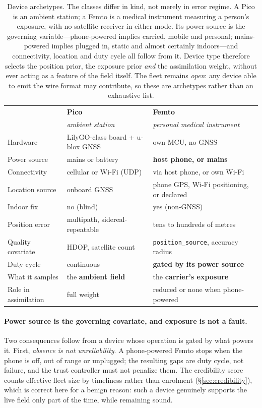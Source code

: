 \documentclass[10pt]{article}
\begin{document}
\begin{table}[t]
\centering
\small
\begin{tabular}{@{}lll@{}}
\toprule
& \textbf{Pico} & \textbf{Femto} \\
& \emph{ambient station} & \emph{personal medical instrument} \\
\midrule
Hardware & LilyGO-class board + u-blox GNSS & own MCU, no GNSS \\
Power source & mains or battery & \textbf{host phone, or mains} \\
Connectivity & cellular or Wi-Fi (UDP) & via host phone, or own Wi-Fi \\
Location source & onboard GNSS & phone GPS, Wi-Fi positioning, or declared \\
Indoor fix & no (blind) & yes (non-GNSS) \\
Position error & multipath, sidereal-repeatable & tens to hundreds of metres \\
Quality covariate & HDOP, satellite count & \texttt{position\_source}, accuracy radius \\
Duty cycle & continuous & \textbf{gated by its power source} \\
What it samples & the \textbf{ambient field} & the \textbf{carrier's exposure} \\
Role in assimilation & full weight & reduced or none when phone-powered \\
\bottomrule
\end{tabular}
\caption{Device archetypes. The classes differ in kind, not merely in error
regime. A Pico is an ambient station; a Femto is a medical instrument measuring a
person's exposure, with no satellite receiver in either mode. Its power source is
the governing variable---phone-powered implies carried, mobile and personal;
mains-powered implies plugged in, static and almost certainly indoors---and
connectivity, location and duty cycle all follow from it. Device type therefore
selects the position prior, the exposure prior \emph{and} the assimilation weight,
without ever acting as a feature of the field itself. The fleet remains
\emph{open}: any device able to emit the wire format may contribute, so these are
archetypes rather than an exhaustive list.}
\label{tab:devtype}
\end{table}

\paragraph{Power source is the governing covariate, and exposure is not a fault.}
Two consequences follow from a device whose operation is gated by what powers it.
First, \emph{absence is not unreliability}. A phone-powered Femto stops when the
phone is off, out of range or unplugged; the resulting gaps are duty cycle, not
failure, and the trust controller must not penalize them. The credibility score
counts effective fleet size by timeliness rather than enrolment
(\S\ref{sec:credibility}), which is correct here for a benign reason: such a
device genuinely supports the live field only part of the time, while remaining
sound.
\end{document}
